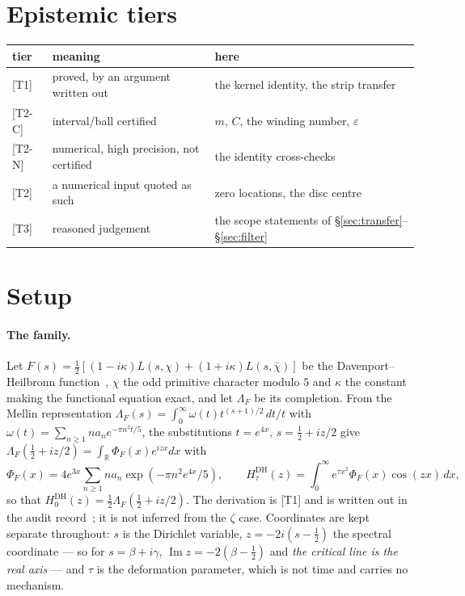 \documentclass[11pt,a4paper]{article}
\theoremstyle{remark}
\newcommand{\tier}[1]{{\small\textsf{[#1]}}}
\newcommand{\PhiF}{\Phi_F}
\newcommand{\HDH}{H^{\mathrm{DH}}}
\begin{document}
\section*{Epistemic tiers}

\begin{center}
\begin{tabular}{@{}lll@{}}
\toprule
tier & meaning & here \\
\midrule
\tier{T1} & proved, by an argument written out & the kernel identity, the strip transfer \\
\tier{T2-C} & interval/ball certified & $m$, $C$, the winding number, $\varepsilon$ \\
\tier{T2-N} & numerical, high precision, not certified & the identity cross-checks \\
\tier{T2} & a numerical input quoted as such & zero locations, the disc centre \\
\tier{T3} & reasoned judgement & the scope statements of \S\ref{sec:transfer}--\S\ref{sec:filter} \\
\bottomrule
\end{tabular}
\end{center}

\section{Setup}\label{sec:setup}

\paragraph{The family.} Let $F(s)=\tfrac12[(1-i\kappa)L(s,\chi)+(1+i\kappa)L(s,\bar\chi)]$ be
the Davenport--Heilbronn function~\cite{DH36,BG11}, $\chi$ the odd primitive character
modulo $5$ and $\kappa$ the constant making the functional equation exact, and let
$\Lambda_F$ be its completion. From the Mellin representation
$\Lambda_F(s)=\int_0^\infty\omega(t)t^{(s+1)/2}\,dt/t$ with
$\omega(t)=\sum_{n\ge1}na_ne^{-\pi n^2t/5}$, the substitutions $t=e^{4x}$,
$s=\tfrac12+iz/2$ give $\Lambda_F(\tfrac12+iz/2)=\int_{\mathbb R}\PhiF(x)e^{izx}dx$ with
\begin{equation}\label{eq:kernel}
  \PhiF(x)=4e^{3x}\sum_{n\ge1}na_n\exp(-\pi n^2e^{4x}/5),\qquad
  \HDH_\tau(z)=\int_0^\infty e^{\tau x^2}\PhiF(x)\cos(zx)\,dx,
\end{equation}
so that $\HDH_0(z)=\tfrac12\Lambda_F(\tfrac12+iz/2)$. The derivation is \tier{T1} and is
written out in the audit record~\cite[\S2]{audit}; it is not inferred from the $\zeta$ case.
Coordinates are kept separate throughout: $s$ is the Dirichlet variable, $z=-2i(s-\tfrac12)$
the spectral coordinate --- so for $s=\beta+i\gamma$, $\operatorname{Im}z=-2(\beta-\tfrac12)$
and \emph{the critical line is the real axis} --- and $\tau$ is the deformation parameter,
which is not time and carries no mechanism.
\end{document}
